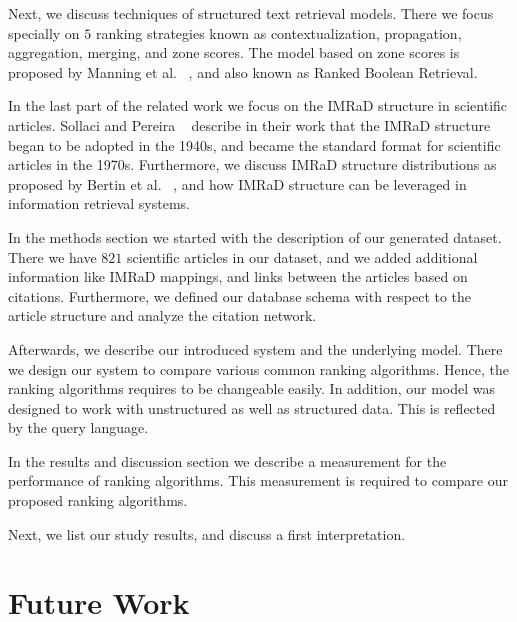 Next, we discuss techniques of structured text retrieval models. There we focus specially on $5$ ranking strategies known as contextualization, propagation, aggregation, merging, and zone scores. The model based on zone scores is proposed by Manning et al. ~\cite{manning2008}, and also known as Ranked Boolean Retrieval.

In the last part of the related work we focus on the IMRaD structure in scientific articles. Sollaci and Pereira ~\cite{Sollaci-The-2004} describe in their work that the IMRaD structure began to be adopted in the 1940s, and became the standard format for scientific articles in the 1970s. Furthermore, we discuss IMRaD structure distributions as proposed by Bertin et al. ~\cite{bertin2013}, and how IMRaD structure can be leveraged in information retrieval systems.

In the methods section we started with the description of our generated dataset. There we have $821$ scientific articles in our dataset, and we added additional information like IMRaD mappings, and links between the articles based on citations. Furthermore, we defined our database schema with respect to the article structure and analyze the citation network.

Afterwards, we describe our introduced system and the underlying model. There we design our system to compare various common ranking algorithms. Hence, the ranking algorithms requires to be changeable easily. In addition, our model was designed to work with unstructured as well as structured data. This is reflected by the query language.

In the results and discussion section we describe a measurement for the performance of ranking algorithms. This measurement is required to compare our proposed ranking algorithms.

Next, we list our study results, and discuss a first interpretation. 




\section{Future Work}
\label{sec:future_work}





